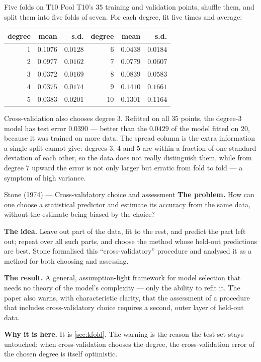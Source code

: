 \begin{workedexample}{Five folds on T10}
Pool T10's $35$ training and validation points, shuffle them, and split them
into five folds of seven. For each degree, fit five times and average:

\begin{center}
\small
\renewcommand{\arraystretch}{1.15}
\begin{tabular}{@{}rrr@{\qquad}rrr@{}}
\toprule
degree & mean & s.d. & degree & mean & s.d.\\
\midrule
$1$ & $0.1076$ & $0.0128$ & $6$  & $0.0438$ & $0.0184$\\
$2$ & $0.0977$ & $0.0162$ & $7$  & $0.0779$ & $0.0607$\\
$3$ & $\mathbf{0.0372}$ & $0.0169$ & $8$  & $0.0839$ & $0.0583$\\
$4$ & $0.0375$ & $0.0174$ & $9$  & $0.1410$ & $0.1661$\\
$5$ & $0.0383$ & $0.0201$ & $10$ & $0.1301$ & $0.1164$\\
\bottomrule
\end{tabular}
\end{center}

Cross-validation also chooses degree $3$. Refitted on all $35$ points, the
degree-$3$ model has test error $0.0390$ --- better than the $0.0429$ of the
model fitted on $20$, because it was trained on more data. The spread column is
the extra information a single split cannot give: degrees $3$, $4$ and $5$ are
within a fraction of one standard deviation of each other, so the data does not
really distinguish them, while from degree $7$ upward the error is not only
larger but erratic from fold to fold --- a symptom of high variance.
\end{workedexample}

\begin{researchspotlight}{Stone (1974) --- Cross-validatory choice and assessment}
\textbf{The problem.} How can one choose a statistical predictor and estimate
its accuracy from the same data, without the estimate being biased by the
choice?

\textbf{The idea.} Leave out part of the data, fit to the rest, and predict the
part left out; repeat over all such parts, and choose the method whose held-out
predictions are best. Stone formalised this ``cross-validatory'' procedure and
analysed it as a method for both choosing and assessing.

\textbf{The result.} A general, assumption-light framework for model selection
that needs no theory of the model's complexity --- only the ability to refit it.
The paper also warns, with characteristic clarity, that the assessment of a
procedure that includes cross-validatory choice requires a second, outer layer of
held-out data.

\textbf{Why it is here.} It is \cref{sec:kfold}. The warning is the reason the
test set stays untouched: when cross-validation chooses the degree, the
cross-validation error of the chosen degree is itself optimistic.
\parencite{stone1974}
\end{researchspotlight}

